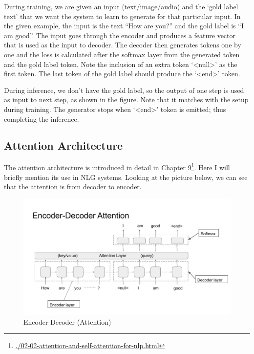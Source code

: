 \documentclass[]{krantz}
\renewcommand{\href}[2]{#2\footnote{\url{#1}}}
\begin{document}
During training, we are given an input (text/image/audio) and the `gold label text' that we want the system to learn to generate for that particular input. In the given example, the input is the text ``How are you?'' and the gold label is ``I am good''. The input goes through the encoder and produces a feature vector that is used as the input to decoder. The decoder then generates tokens one by one and the loss is calculated after the softmax layer from the generated token and the gold label token. Note the inclusion of an extra token `\textless{}null\textgreater{}' as the first token. The last token of the gold label should produce the `\textless{}end\textgreater{}' token.

During inference, we don't have the gold label, so the output of one step is used as input to next step, as shown in the figure. Note that it matches with the setup during training. The generator stops when `\textless{}end\textgreater{}' token is emitted; thus completing the inference.

\hypertarget{attention-architecture}{%
\subsection{Attention Architecture}\label{attention-architecture}}

The attention architecture is introduced in detail in \href{./02-02-attention-and-self-attention-for-nlp.html}{Chapter 9}. Here I will briefly mention its use in NLG systems. Looking at the picture below, we can see that the attention is from decoder to encoder.

\begin{figure}
\centering
\includegraphics{figures/04-01-use-case1/encoder_decoder_attn.jpg}
\caption{Encoder-Decoder (Attention)}
\end{figure}
\end{document}

